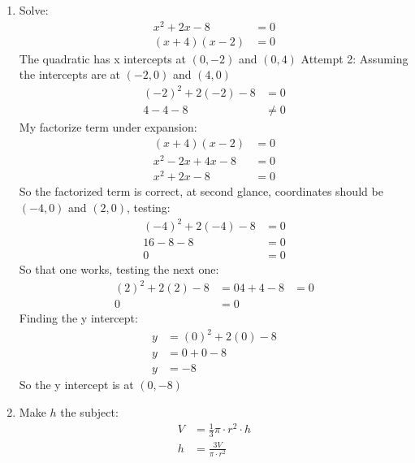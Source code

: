 \documentclass{article}
\begin{document}
\begin{enumerate}
    \item Solve:
    \begin{align*}
      x^{2} + 2x - 8 &= 0 \\
      (x + 4)(x - 2) &= 0
    \end{align*}
    The quadratic has x intercepts at $(0, -2)$ and $(0, 4)$
    Attempt 2:
    Assuming the intercepts are at $(-2, 0)$ and $(4, 0)$
    \begin{align*}
      (-2)^{2} + 2(-2) -8 &= 0 \\
      4 - 4 - 8 &\neq 0
    \end{align*}
    My factorize term under expansion:
    \begin{align*}
      (x + 4)(x - 2) &= 0 \\
      x^{2} - 2x + 4x - 8 &= 0 \\
      x^{2} + 2x - 8 &= 0 
    \end{align*}
    So the factorized term is correct, at second glance, coordinates should be $(-4, 0)$ and $(2, 0)$, testing:
    \begin{align*}
      (-4)^{2} + 2(-4) - 8 &= 0 \\
      16 - 8 - 8 &= 0 \\
      0 &= 0
    \end{align*}
    So that one works, testing the next one:
    \begin{align*}
      (2)^{2} + 2(2) - 8 &= 0
      4 + 4 - 8 &= 0 \\
      0 &= 0
    \end{align*}
    Finding the y intercept:
    \begin{align*}
      y &= (0)^{2} + 2(0) - 8 \\
      y &= 0 + 0 - 8 \\
      y &= -8
    \end{align*}
    So the y intercept is at $(0, -8)$
    
    
  \item Make $h$ the subject:
    \begin{align*}
       V &= \frac{1}{3} \pi \cdot r^{2} \cdot h \\
      h &= \frac{3 V}{\pi \cdot r^{2}}
    \end{align*}


\end{enumerate}
\end{document}
